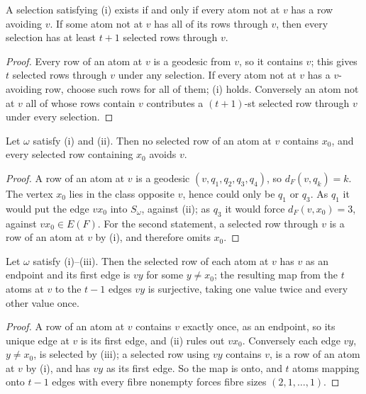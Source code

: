 \begin{lemma}[Tightness]\label{lem:tight}
A selection satisfying \textup{(i)} exists if and only if every atom
not at \(v\) has a row avoiding \(v\). If some atom not at \(v\) has
all of its rows through \(v\), then every selection has at least
\(t+1\) selected rows through \(v\).
\end{lemma}

\begin{proof}
Every row of an atom at \(v\) is a geodesic from \(v\), so it contains
\(v\); this gives \(t\) selected rows through \(v\) under any
selection. If every atom not at \(v\) has a \(v\)-avoiding row, choose
such rows for all of them; (i) holds. Conversely an atom not at \(v\)
all of whose rows contain \(v\) contributes a \((t+1)\)-st selected
row through \(v\) under every selection.
\end{proof}

\begin{lemma}[Positions]\label{lem:positions}
Let \(\omega\) satisfy \textup{(i)} and \textup{(ii)}. Then no
selected row of an atom at \(v\) contains \(x_0\), and every selected
row containing \(x_0\) avoids \(v\).
\end{lemma}

\begin{proof}
A row of an atom at \(v\) is a geodesic \((v,q_1,q_2,q_3,q_4)\), so
\(d_F(v,q_k)=k\). The vertex \(x_0\) lies in the class opposite
\(v\), hence could only be \(q_1\) or \(q_3\). As \(q_1\) it would put
the edge \(vx_0\) into \(S_\omega\), against (ii); as \(q_3\) it would
force \(d_F(v,x_0)=3\), against \(vx_0\in E(F)\). For the second
statement, a selected row through \(v\) is a row of an atom at \(v\)
by (i), and therefore omits \(x_0\).
\end{proof}

\begin{lemma}\label{lem:steps}
Let \(\omega\) satisfy \textup{(i)}--\textup{(iii)}. Then the selected
row of each atom at \(v\) has \(v\) as an endpoint and its first edge
is \(vy\) for some \(y\neq x_0\); the resulting map from the \(t\)
atoms at \(v\) to the \(t-1\) edges \(vy\) is surjective, taking one
value twice and every other value once.
\end{lemma}

\begin{proof}
A row of an atom at \(v\) contains \(v\) exactly once, as an endpoint,
so its unique edge at \(v\) is its first edge, and (ii) rules out
\(vx_0\). Conversely each edge \(vy\), \(y\neq x_0\), is selected by
(iii); a selected row using \(vy\) contains \(v\), is a row of an atom
at \(v\) by (i), and has \(vy\) as its first edge. So the map is onto,
and \(t\) atoms mapping onto \(t-1\) edges with every fibre nonempty
forces fibre sizes \((2,1,\dots,1)\).
\end{proof}

